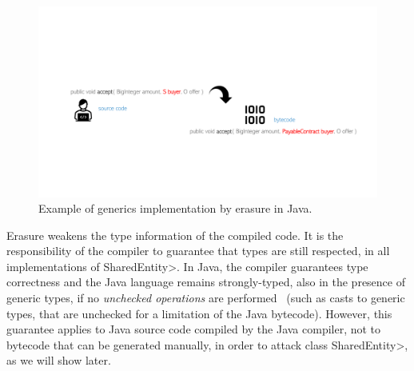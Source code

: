 \begin{figure}[ht]
\centering
\includegraphics[width=.9\linewidth]{figures/java_generics_erasure}
\caption{Example of generics implementation by erasure in Java.}
\label{figure.java_generics_erasure}
\end{figure}

Erasure weakens the type information of the compiled code. It is the responsibility of the
compiler to guarantee that types are still respected, in all implementations of \<SharedEntity>.
In Java, the compiler guarantees type correctness and the Java language remains strongly-typed,
also in the presence of generic types,
if no \emph{unchecked operations} are performed~\cite{NaftalinW06} (such as casts to generic types,
that are unchecked for a limitation of the Java bytecode).
However, this guarantee applies to Java source code compiled by the Java compiler,
not to bytecode that can be generated manually, in order to attack class \<SharedEntity>,
as we will show later.
